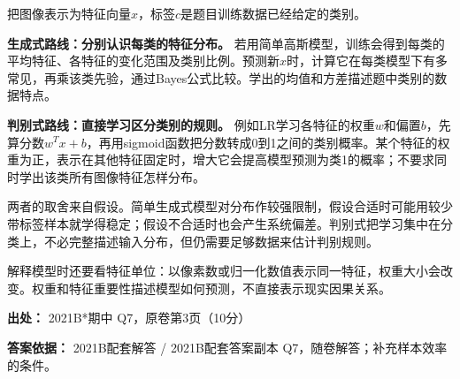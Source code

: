 把图像表示为特征向量\(x\)，标签\(c\)是题目训练数据已经给定的类别。


\textbf{生成式路线：分别认识每类的特征分布。} 若用简单高斯模型，训练会得到每类的平均特征、各特征的变化范围及类别比例。预测新\(x\)时，计算它在每类模型下有多常见，再乘该类先验，通过Bayes公式比较。学出的均值和方差描述题中类别的数据特点。


\textbf{判别式路线：直接学习区分类别的规则。} 例如LR学习各特征的权重\(w\)和偏置\(b\)，先算分数\(w^Tx+b\)，再用sigmoid函数把分数转成0到1之间的类别概率。某个特征的权重为正，表示在其他特征固定时，增大它会提高模型预测为类1的概率；不要求同时学出该类所有图像特征怎样分布。


两者的取舍来自假设。简单生成式模型对分布作较强限制，假设合适时可能用较少带标签样本就学得稳定；假设不合适时也会产生系统偏差。判别式把学习集中在分类上，不必完整描述输入分布，但仍需要足够数据来估计判别规则。


解释模型时还要看特征单位：以像素数或归一化数值表示同一特征，权重大小会改变。权重和特征重要性描述模型如何预测，不直接表示现实因果关系。


\textbf{出处：} 2021B*期中 Q7，原卷第3页（10分）


\textbf{答案依据：} 2021B配套解答 / 2021B配套答案副本 Q7，随卷解答；补充样本效率的条件。
